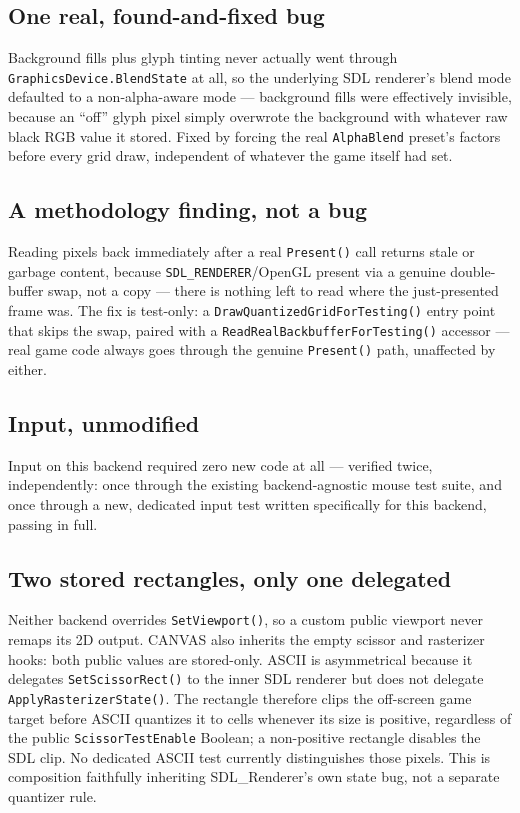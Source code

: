 \subsection{One real, found-and-fixed bug}

Background fills plus glyph tinting never actually went through
\texttt{GraphicsDevice.BlendState} at all, so the underlying SDL renderer's blend mode
defaulted to a non-alpha-aware mode --- background fills were effectively invisible, because
an ``off'' glyph pixel simply overwrote the background with whatever raw black RGB value it
stored. Fixed by forcing the real \texttt{AlphaBlend} preset's factors before every grid draw,
independent of whatever  the game itself had set.

\subsection{A methodology finding, not a bug}

Reading pixels back immediately after a real \texttt{Present()} call returns stale or
garbage content, because \texttt{SDL\_RENDERER}/OpenGL present via a genuine double-buffer
swap, not a copy --- there is nothing left to read where the just-presented frame was. The
fix is test-only: a \texttt{DrawQuantizedGridForTesting()} entry point that skips the swap,
paired with a \texttt{Read\allowbreak{}RealBackbuffer\allowbreak{}ForTesting()} accessor --- real game code always goes
through the genuine \texttt{Present()} path, unaffected by either.

\subsection{Input, unmodified}

Input on this backend required zero new code at all --- verified twice, independently: once
through the existing backend-agnostic mouse test suite, and once through a new, dedicated
input test written specifically for this backend, passing in full.

\subsection{Two stored rectangles, only one delegated}

Neither backend overrides \texttt{SetViewport()}, so a custom public viewport never remaps its
2D output. CANVAS also inherits the empty scissor and rasterizer hooks: both public values are
stored-only. ASCII is asymmetrical because it delegates \texttt{SetScissorRect()} to the inner
SDL renderer but does not delegate \texttt{ApplyRasterizerState()}. The rectangle therefore
clips the off-screen game target before ASCII quantizes it to cells whenever its size is
positive, regardless of the public \texttt{ScissorTestEnable} Boolean; a non-positive rectangle
disables the SDL clip. No dedicated ASCII test currently distinguishes those pixels. This is
composition faithfully inheriting SDL\_Renderer's own state bug, not a separate quantizer rule.


